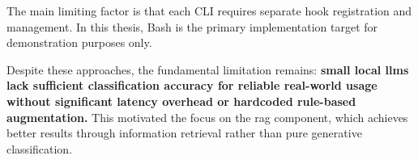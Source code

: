 %
%

The main limiting factor is that each CLI requires separate hook registration and
management. In this thesis, Bash is the primary implementation target for demonstration
purposes only.

%
%

Despite these approaches, the fundamental limitation remains: \textbf{small local \glspl{llm}
lack sufficient classification accuracy for reliable real-world usage without significant
latency overhead or hardcoded rule-based augmentation.} This motivated the focus on the
\gls{rag} component, which achieves better results through information retrieval rather
than pure generative classification.

